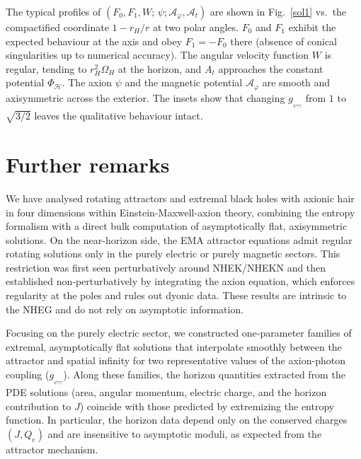 \documentclass[11pt]{article}
\numberwithin{equation}{section} %
\begin{document}
 The typical profiles of $(F_0,F_1,W;\,\psi;\mathcal{A}_\varphi,\mathcal{A}_t)$ are shown in Fig.~\ref{sol1} vs.\ the compactified coordinate $1-r_H/r$ at two polar angles. $F_0$ and $F_1$ exhibit the expected behaviour at the axis and obey $F_1=-F_0$ there (absence of conical singularities up to numerical accuracy). The angular velocity function $W$ is regular, tending to $r_H^2\Omega_H$ at the horizon, and $A_t$ approaches the constant potential $\Phi_{\mathcal H}$. The axion $\psi$ and the magnetic potential $\mathcal{A}_\varphi$ are smooth and axisymmetric across the exterior. The insets show that changing $g_{_{\psi\gamma\gamma}}$ from $1$ to $\sqrt{3/2}$ leaves the qualitative behaviour intact. 




\section{Further remarks}

We have analysed rotating attractors and extremal black holes with axionic hair in four dimensions within Einstein-Maxwell-axion theory, combining the entropy formalism with a direct bulk computation of asymptotically flat, axisymmetric solutions. On the near-horizon side, the EMA attractor equations admit regular rotating solutions only in the purely electric or purely magnetic sectors. This restriction was first seen perturbatively around NHEK/NHEKN and then established non‑perturbatively by integrating the axion equation, which enforces regularity at the poles and rules out dyonic data. These results are intrinsic to the NHEG and do not rely on asymptotic information. 

Focusing on the purely electric sector, we constructed one‑parameter families of extremal, asymptotically flat solutions that interpolate smoothly between the attractor and spatial infinity for two representative values of the axion-photon coupling ($g_{_{\psi\gamma\gamma}}$). Along these families, the horizon quantities extracted from the PDE solutions (area, angular momentum, electric charge, and the horizon contribution to $J$) coincide with those predicted by extremizing the entropy function. In particular, the horizon data depend only on the conserved charges $(J,Q_e)$ and are insensitive to asymptotic moduli, as expected from the attractor mechanism. 
\end{document}
